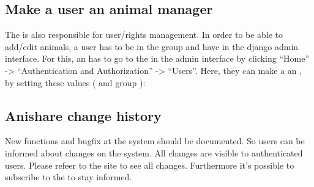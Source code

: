\documentclass[letterpaper,10pt,openany,oneside,english]{sphinxmanual}
\begin{document}
\subsection{Make a user an animal manager}
\label{\detokenize{index:make-a-user-an-animal-manager}}
The  is also responsible for user/rights management.
In order to be able to add/edit animals, a user has to be in the group  and have
 in the django admin interface. For this, an  has to go to the  in the admin interface by clicking “Home” -\textgreater{} “Authentication and
Authorization” -\textgreater{} “Users”. Here, they can make a  an , by setting these values (
and group ):

\noindent{}


\subsection{Anishare change history}
\label{\detokenize{index:anishare-change-history}}
New functions and bugfix at the system should be documented. So users can be informed about changes on the system.
All changes are visible to authenticated users. Please refeer to the site  to see all changes. Furthermore it’s possible to subscribe to
the  to stay informed.



\renewcommand{\indexname}{Index}
\printindex
\end{document}
